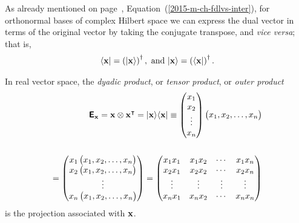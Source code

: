 As already mentioned on page~\pageref{2015-m-ch-fdlvs-inter}, Equation~(\ref{2015-m-ch-fdlvs-inter}), for orthonormal bases of complex Hilbert space
we can express the dual vector in terms of the original vector by
taking the conjugate transpose, and {\em vice versa}; that is,
\begin{equation}
\begin{split}
\langle {\bf x} \vert = \left(\vert {\bf x}\rangle \right)^\dagger,
\textrm{ and }
\vert {\bf x}\rangle  = \left(\langle {\bf x}\vert\right)^\dagger.
\end{split}
\end{equation}

In real vector space, the {\em dyadic product}, or {\em tensor product}, or {\em outer product}
\begin{equation}
\begin{split}
\textsf{\textbf{E}}_{\bf x} = {\bf x} \otimes {\bf x}^\intercal  = \vert{\bf x}\rangle \langle {\bf x}\vert
\equiv
\begin{pmatrix}
x_1\\
x_2\\
\vdots \\
x_n
\end{pmatrix}
\begin{pmatrix}x_1,x_2,\ldots ,x_n\end{pmatrix}\\
\\
=
\begin{pmatrix}
x_1\begin{pmatrix}x_1,x_2,\ldots ,x_n\end{pmatrix}\\
x_2\begin{pmatrix}x_1,x_2,\ldots ,x_n\end{pmatrix}\\
\vdots  \\
x_n\begin{pmatrix}x_1,x_2,\ldots ,x_n \end{pmatrix}
\end{pmatrix}
=
\begin{pmatrix}
x_1x_1&x_1x_2& \cdots&x_1x_n\\
x_2x_1&x_2x_2& \cdots&x_2x_n\\
\vdots & \vdots & \vdots &\vdots \\
x_nx_1&x_nx_2& \cdots&x_nx_n
\end{pmatrix}
\end{split}
\end{equation}
is the projection
associated with ${\bf x}$.

